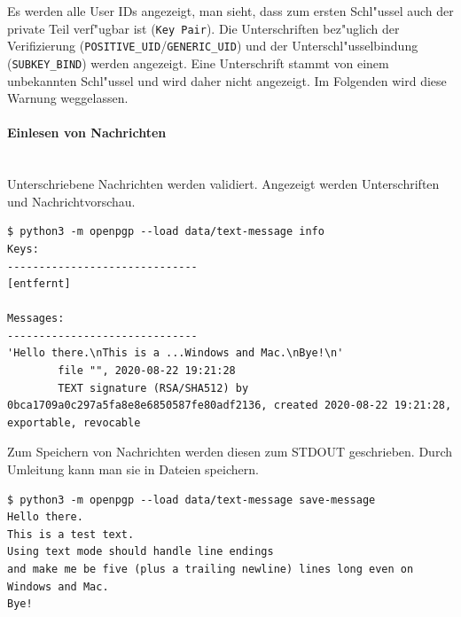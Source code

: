 \documentclass[12pt]{article}
\begin{document}
Es werden alle User IDs angezeigt, man sieht, dass zum ersten Schl"ussel auch der private Teil verf"ugbar ist (\texttt{Key Pair}).
Die Unterschriften bez"uglich der Verifizierung (\texttt{POSITIVE\_UID}/\texttt{GENERIC\_UID})
und der Unterschl"usselbindung (\texttt{SUBKEY\_BIND}) werden angezeigt.
Eine Unterschrift stammt von einem unbekannten Schl"ussel und wird daher nicht angezeigt.
Im Folgenden wird diese Warnung weggelassen.

\paragraph{Einlesen von Nachrichten}~\\
Unterschriebene Nachrichten werden validiert.
Angezeigt werden Unterschriften und Nachrichtvorschau.
\begin{lstlisting}
$ python3 -m openpgp --load data/text-message info
Keys:
------------------------------
[entfernt]

Messages:
------------------------------
'Hello there.\nThis is a ...Windows and Mac.\nBye!\n'
        file "", 2020-08-22 19:21:28
        TEXT signature (RSA/SHA512) by 0bca1709a0c297a5fa8e8e6850587fe80adf2136, created 2020-08-22 19:21:28, exportable, revocable
\end{lstlisting}
Zum Speichern von Nachrichten werden diesen zum STDOUT geschrieben.
Durch Umleitung kann man sie in Dateien speichern.
\begin{lstlisting}
$ python3 -m openpgp --load data/text-message save-message
Hello there.
This is a test text.
Using text mode should handle line endings
and make me be five (plus a trailing newline) lines long even on Windows and Mac.
Bye!
\end{lstlisting}
\end{document}
